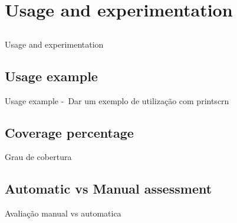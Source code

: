 \chapter{Usage and experimentation} \label{chap:usage}

\section*{}

Usage and experimentation

\section{Usage example} \label{sec:usageexample}
	Usage example - Dar um exemplo de utilização com printscrn


\section{Coverage percentage} \label{sec:coverage}
	Grau de cobertura
	
\section{Automatic vs Manual assessment} \label{sec:automatic}
	Avaliação manual vs automatica